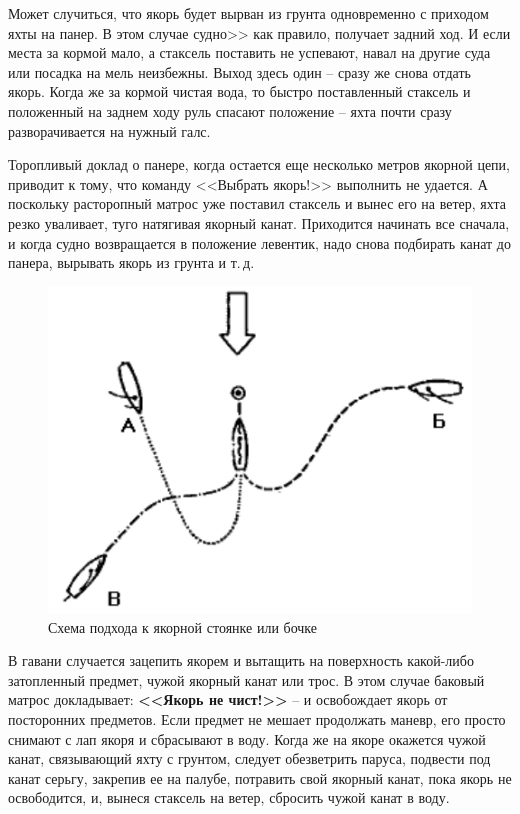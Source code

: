 \documentclass[a4paper, 12pt, twoside, final]{scrbook}
\begin{document}
Может случиться, что якорь будет вырван из грунта одновременно с приходом яхты на панер. В этом случае судно>> как правило, получает задний ход. И если места за кормой мало, а стаксель поставить не успевают, навал на другие суда или посадка на мель неизбежны. Выход здесь один \--- сразу же снова отдать якорь. Когда же за кормой чистая вода, то быстро поставленный стаксель и положенный на заднем ходу руль спасают положение \--- яхта почти сразу разворачивается на нужный галс.

Торопливый доклад о панере, когда остается еще несколько метров якорной цепи, приводит к тому, что команду <<Выбрать якорь!>> выполнить не удается. А поскольку расторопный матрос уже поставил стаксель и вынес его на ветер, яхта резко уваливает, туго натягивая якорный канат. Приходится начинать все сначала, и когда судно возвращается в положение левентик, надо снова подбирать канат до панера, вырывать якорь из грунта и т.\,д.

\begin{figure}
	\centering
	\includegraphics[scale=1]{128_Podhod_k_jakorno_stojanke}
	\caption{Схема подхода к якорной стоянке или бочке}
	\label{fig:128}
\end{figure}

В гавани случается зацепить якорем и вытащить на поверхность какой-либо затопленный предмет, чужой якорный канат или трос. В этом случае баковый матрос докладывает: \textbf{<<Якорь не чист!>>} \--- и освобождает якорь от посторонних предметов. Если предмет не мешает продолжать маневр, его просто снимают с лап якоря и сбрасывают в воду. Когда же на якоре окажется чужой канат, связывающий яхту с грунтом, следует обезветрить паруса, подвести под канат серьгу, закрепив ее на палубе, потравить свой якорный канат, пока якорь не освободится, и, вынеся стаксель на ветер, сбросить чужой канат в воду.
\end{document}
